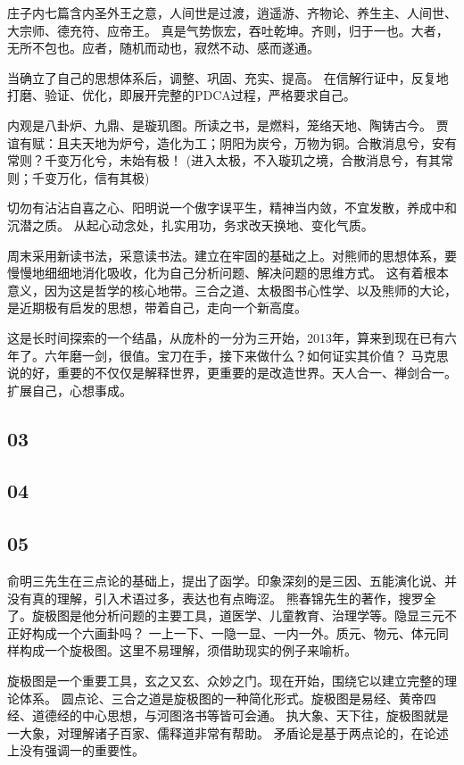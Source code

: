 庄子内七篇含内圣外王之意，人间世是过渡，逍遥游、齐物论、养生主、人间世、大宗师、德充符、应帝王。
真是气势恢宏，吞吐乾坤。齐则，归于一也。大者，无所不包也。应者，随机而动也，寂然不动、感而遂通。

当确立了自己的思想体系后，调整、巩固、充实、提高。
在信解行证中，反复地打磨、验证、优化，即展开完整的PDCA过程，严格要求自己。

内观是八卦炉、九鼎、是璇玑图。所读之书，是燃料，笼络天地、陶铸古今。
贾谊有赋：且夫天地为炉兮，造化为工；阴阳为炭兮，万物为铜。合散消息兮，安有常则？千变万化兮，未始有极！
(进入太极，不入璇玑之境，合散消息兮，有其常则；千变万化，信有其极)

切勿有沾沾自喜之心、阳明说一个傲字误平生，精神当内敛，不宜发散，养成中和沉潜之质。
从起心动念处，扎实用功，务求改天换地、变化气质。

周末采用新读书法，采意读书法。建立在牢固的基础之上。对熊师的思想体系，要慢慢地细细地消化吸收，化为自己分析问题、解决问题的思维方式。
这有着根本意义，因为这是哲学的核心地带。三合之道、太极图书心性学、以及熊师的大论，是近期极有启发的思想，带着自己，走向一个新高度。

这是长时间探索的一个结晶，从庞朴的一分为三开始，2013年，算来到现在已有六年了。六年磨一剑，很值。宝刀在手，接下来做什么？如何证实其价值？
马克思说的好，重要的不仅仅是解释世界，更重要的是改造世界。天人合一、禅剑合一。扩展自己，心想事成。

\subsection{03}

\subsection{04}

\subsection{05}

俞明三先生在三点论的基础上，提出了函学。印象深刻的是三因、五能演化说、并没有真的理解，引入术语过多，表达也有点晦涩。
熊春锦先生的著作，搜罗全了。旋极图是他分析问题的主要工具，道医学、儿童教育、治理学等。隐显三元不正好构成一个六画卦吗？
一上一下、一隐一显、一内一外。质元、物元、体元同样构成一个旋极图。这里不易理解，须借助现实的例子来喻析。

旋极图是一个重要工具，玄之又玄、众妙之门。现在开始，围绕它以建立完整的理论体系。
圆点论、三合之道是旋极图的一种简化形式。旋极图是易经、黄帝四经、道德经的中心思想，与河图洛书等皆可会通。
执大象、天下往，旋极图就是一大象，对理解诸子百家、儒释道非常有帮助。
矛盾论是基于两点论的，在论述上没有强调一的重要性。

